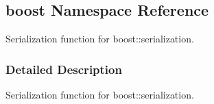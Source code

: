 \hypertarget{namespaceboost}{\subsection{boost Namespace Reference}
\label{namespaceboost}
}


Serialization function for boost\+::serialization.  




\subsubsection{Detailed Description}
Serialization function for boost\+::serialization. 

